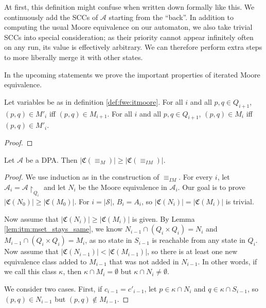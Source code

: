 At first, this definition might confuse when written down formally like this. %
We continuously add the SCCs of $\mathcal{A}$ starting from the \enquote{back}. In addition to computing the usual Moore equivalence on our automaton, we also take trivial SCCs into special consideration; as their priority cannot appear infinitely often on any run, its value is effectively arbitrary. We can therefore perform extra steps to more liberally merge it with other states.

In the upcoming statements we prove the important properties of iterated Moore equivalence.

\begin{lem}
\label{lem:itm:mset_stays_same}
	Let variables be as in definition \ref{def:fwe:itmoore}. For all $i$ and all $p, q \in Q_{i+1}$, $(p, q) \in M'_i$ iff $(p, q) \in M_{i+1}$. For all $i$ and all $p, q \in Q_{i+1}$, $(p, q) \in M_i$ iff $(p, q) \in M'_i$.
\end{lem}

\begin{proof}
\end{proof}

\begin{theorem}
	Let $\mathcal{A}$ be a DPA. Then $|\mathfrak{C}(\equiv_M)| \geq |\mathfrak{C}(\equiv_{IM})|$.
\end{theorem}

\begin{proof}
	We use induction as in the construction of $\equiv_{IM}$. For every $i$, let $\mathcal{A}_i = \mathcal{A} \upharpoonright_{Q_i}$ and let $N_i$ be the Moore equivalence in $\mathcal{A}_i$. Our goal is to prove $|\mathfrak{C}(N_0)| \geq |\mathfrak{C}(M_0)|$. For $i = |\mathcal{S}|$, $B_i = A_i$, so $|\mathfrak{C}(N_i)| = |\mathfrak{C}(M_i)|$ is trivial.
	
	Now assume that $|\mathfrak{C}(N_i)| \geq |\mathfrak{C}(M_i)|$ is given. By Lemma \ref{lem:itm:mset_stays_same}, we know $N_{i-1} \cap (Q_i \times Q_i) = N_i$ and $M_{i-1} \cap (Q_i \times Q_i) = M_i$, as no state in $S_{i-1}$ is reachable from any state in $Q_i$. Now assume that $|\mathfrak{C}(N_{i-1})| < |\mathfrak{C}(M_{i-1})|$, so there is at least one new equivalence class added to $M_{i-1}$ that was not added in $N_{i-1}$. In other words, if we call this class $\kappa$, then $\kappa \cap M_i = \emptyset$ but $\kappa \cap N_i \neq \emptyset$. 
	
	We consider two cases. First, if $c_{i-1} = c'_{i-1}$, let $p \in \kappa \cap N_i$ and $q \in \kappa \cap S_{i-1}$, so $(p, q) \in N_{i-1}$ but $(p, q) \notin M_{i-1}$. %
\end{proof}


